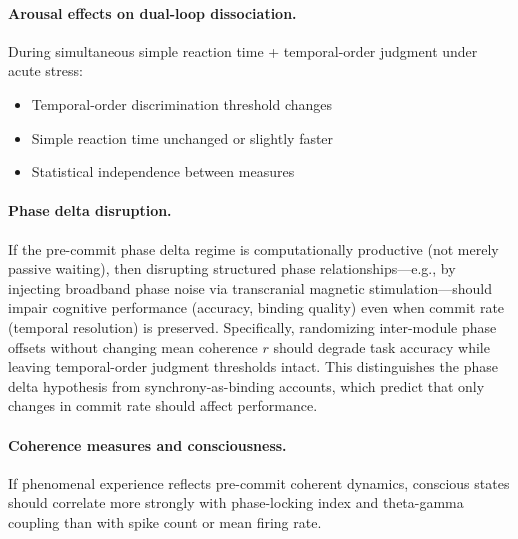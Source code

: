 \documentclass[12pt]{article}
\begin{document}
\paragraph{Arousal effects on dual-loop dissociation.}
During simultaneous simple reaction time + temporal-order judgment under acute stress:
\begin{itemize}
\item Temporal-order discrimination threshold changes
\item Simple reaction time unchanged or slightly faster
\item Statistical independence between measures
\end{itemize}

\paragraph{Phase delta disruption.}
If the pre-commit phase delta regime is computationally productive (not merely passive waiting), then disrupting structured phase relationships---e.g., by injecting broadband phase noise via transcranial magnetic stimulation---should impair cognitive performance (accuracy, binding quality) even when commit rate (temporal resolution) is preserved. Specifically, randomizing inter-module phase offsets without changing mean coherence $r$ should degrade task accuracy while leaving temporal-order judgment thresholds intact. This distinguishes the phase delta hypothesis from synchrony-as-binding accounts, which predict that only changes in commit rate should affect performance.

\paragraph{Coherence measures and consciousness.}
If phenomenal experience reflects pre-commit coherent dynamics, conscious states should correlate more strongly with phase-locking index and theta-gamma coupling than with spike count or mean firing rate.
\end{document}
